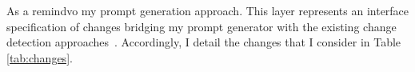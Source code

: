 As a remindvo my prompt generation approach.  This layer represents an interface specification of changes {\small{}} bridging my prompt generator with the existing change detection approaches~\cite{Alter2015, williams2012searching,cicchetti_managing_2009,langer_posteriori_2013,vermolen_reconstructing_2012,Khelladi2016}.
Accordingly, I detail the changes that I consider in Table \ref{tab:changes}. 
%


